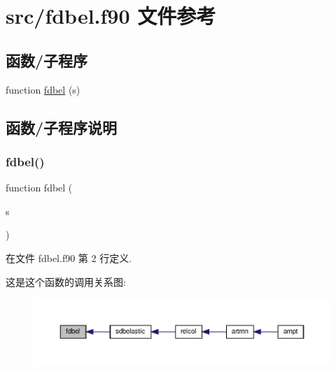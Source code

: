 \hypertarget{fdbel_8f90}{}\section{src/fdbel.f90 文件参考}
\label{fdbel_8f90}
\subsection*{函数/子程序}
\begin{DoxyCompactItemize}
\item 
function \mbox{\hyperlink{fdbel_8f90_adfafb1d84b6b3dec5488a08ee4b2ecd4}{fdbel}} (s)
\end{DoxyCompactItemize}


\subsection{函数/子程序说明}
\mbox{\label{fdbel_8f90_adfafb1d84b6b3dec5488a08ee4b2ecd4}} 
\subsubsection{\texorpdfstring{fdbel()}{fdbel()}}
{\footnotesize\ttfamily function fdbel (\begin{DoxyParamCaption}\item[{}]{s }\end{DoxyParamCaption})}



在文件 fdbel.\+f90 第 2 行定义.

这是这个函数的调用关系图\+:
\nopagebreak
\begin{figure}[H]
\begin{center}
\leavevmode
\includegraphics[width=350pt]{fdbel_8f90_adfafb1d84b6b3dec5488a08ee4b2ecd4_icgraph}
\end{center}
\end{figure}
